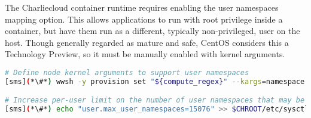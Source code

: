 The Charliecloud container runtime requires enabling the user namespaces mapping
option. This allows applications to run with root privilege inside a container, 
but have them run as a different, typically non-privileged, user on the host.
Though generally regarded as mature and safe, CentOS considers this a Technology
Preview, so it must be manually enabled with kernel arguments.

\begin{lstlisting}[language=bash,keywords={},upquote=true]
# Define node kernel arguments to support user namespaces
[sms](*\#*) wwsh -y provision set "${compute_regex}" --kargs=namespace.unpriv_enable=1

# Increase per-user limit on the number of user namespaces that may be created
[sms](*\#*) echo "user.max_user_namespaces=15076" >> $CHROOT/etc/sysctl.conf'
\end{lstlisting}
